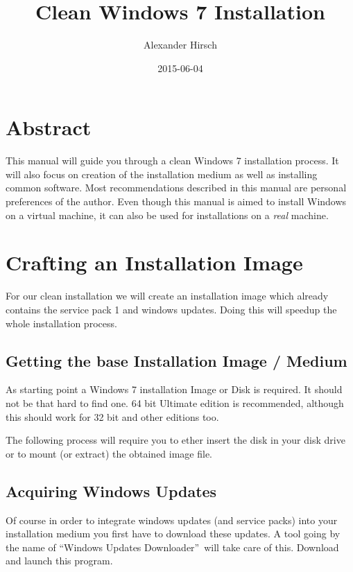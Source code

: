 \documentclass{itsarticle}
\title{Clean Windows 7 Installation}
\author{Alexander Hirsch}
\date{2015-06-04}
\begin{document}
\maketitle

\section*{Abstract}
\label{sec:abstract}

This manual will guide you through a clean Windows 7 installation process. It
will also focus on creation of the installation medium as well as installing
common software. Most recommendations described in this manual are personal
preferences of the author. Even though this manual is aimed to install Windows
on a virtual machine, it can also be used for installations on a \emph{real}
machine.

\section{Crafting an Installation Image}
\label{sec:install_image}

For our clean installation we will create an installation image which already
contains the service pack 1 and windows updates. Doing this will speedup the
whole installation process.

\subsection{Getting the base Installation Image / Medium}
\label{ssec:win7_base_iso}

As starting point a Windows 7 installation Image or Disk is required. It
should not be that hard to find one. 64 bit Ultimate edition is recommended,
although this should work for 32 bit and other editions too.

The following process will require you to ether insert the disk in your disk
drive or to mount (or extract) the obtained image file.

\subsection{Acquiring Windows Updates}
\label{ssec:get_win7_updates}

Of course in order to integrate windows updates (and service packs) into your
installation medium you first have to download these updates. A tool going by
the name of ``Windows Updates Downloader''\footnotemark\ will take care of
this. Download and launch this program.
\end{document}
